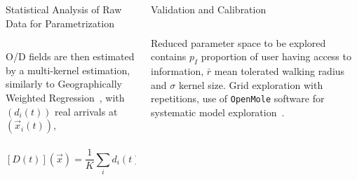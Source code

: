 \documentclass{beamer}
\begin{document}
\begin{frame}{}
\begin{columns}[t]
\begin{column}{.49\textwidth}
\begin{block}{Statistical Analysis of Raw Data for Parametrization}
\begin{columns}[t]
\begin{column}{.95\textwidth}
\begin{justify}
        
        
        \vspace{0.5cm}
        
        O/D fields are then estimated by a multi-kernel estimation, similarly to Geographically Weighted Regression~\cite{brunsdon2002geographically}, with $(d_{i}(t))$
real arrivals at $(\vec{x}_{i}(t))$,
        
        \[
[D(t)](\vec{x})=\frac{1}{K}\sum_{i}d_{i}(t)\cdot \exp\left(\frac{\left\Vert \vec{x}-\vec{x}_{i}\right\Vert }{2\sigma^{2}}\right)
\]
        

          \end{justify}
          \end{column}
          \end{columns}
        \end{block}
        
        
 

         
        
      \end{column}
      
  

      
      \begin{column}{.49\textwidth}



    \vspace{-0.5cm}
    
        
        \begin{block}{Validation and Calibration}
       \vspace{-1cm}
       \begin{columns}[t]
        \begin{column}{.95\textwidth}
       
       \vspace{-1cm}
       
       \begin{justify}
       

       Reduced parameter space to be explored contains $p_I$ proportion of user having access to information, $\bar{r}$ mean tolerated walking radius and $\sigma$ kernel size. Grid exploration with repetitions, use of \texttt{OpenMole} software for systematic model exploration~\cite{reuillon2013openmole}.
       

\end{justify}
\end{column}
\end{columns}
\end{block}
\end{column}
\end{columns}
\end{frame}
\end{document}
